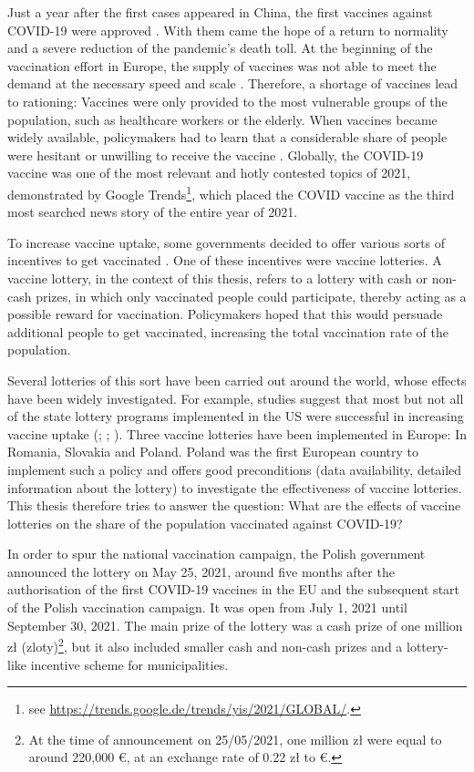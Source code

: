 \documentclass{scrbook}
\begin{document}
Just a year after the first cases appeared in China, the first vaccines
against COVID-19 were approved
\parencite{us_food_and_drug_administration_fda_2020}. With them came the
hope of a return to normality and a severe reduction of the pandemic's
death toll. At the beginning of the vaccination effort in Europe, the
supply of vaccines was not able to meet the demand at the necessary
speed and scale \parencite{bongardt_europes_2021}. Therefore, a shortage
of vaccines lead to rationing: Vaccines were only provided to the most
vulnerable groups of the population, such as healthcare workers or the
elderly. When vaccines became widely available, policymakers had to
learn that a considerable share of people were hesitant or unwilling to
receive the vaccine \parencite{steinert_covid-19_2022}. Globally, the
COVID-19 vaccine was one of the most relevant and hotly contested topics
of 2021, demonstrated by Google
Trends\footnote{see \url{https://trends.google.de/trends/yis/2021/GLOBAL/}.},
which placed the COVID vaccine as the third most searched news story of
the entire year of 2021.

To increase vaccine uptake, some governments decided to offer various
sorts of incentives to get vaccinated \parencite{wyllie_jewellery_2023}.
One of these incentives were vaccine lotteries. A vaccine lottery, in
the context of this thesis, refers to a lottery with cash or non-cash
prizes, in which only vaccinated people could participate, thereby
acting as a possible reward for vaccination. Policymakers hoped that
this would persuade additional people to get vaccinated, increasing the
total vaccination rate of the population.

Several lotteries of this sort have been carried out around the world,
whose effects have been widely investigated. For example, studies
suggest that most but not all of the state lottery programs implemented
in the US were successful in increasing vaccine uptake
(\cite{robertson_are_2021}; \cite{acharya_implementation_2021};
\cite{fuller_assessing_2022}). Three vaccine lotteries have been
implemented in Europe: In Romania, Slovakia and Poland. Poland was the
first European country to implement such a policy and offers good
preconditions (data availability, detailed information about the
lottery) to investigate the effectiveness of vaccine lotteries. This
thesis therefore tries to answer the question: What are the effects of
vaccine lotteries on the share of the population vaccinated against
COVID-19?

In order to spur the national vaccination campaign, the Polish
government announced the lottery
\parencite{service_of_the_republic_of_poland_national_2021} on May 25,
2021, around five months after the authorisation of the first COVID-19
vaccines in the EU and the subsequent start of the Polish vaccination
campaign. It was open from July 1, 2021 until September 30, 2021. The
main prize of the lottery was a cash prize of one million zł
(zloty)\footnote{At the time of announcement on 25/05/2021, one million zł were equal to around 220,000 €, at an exchange rate of 0.22 zł to €.},
but it also included smaller cash and non-cash prizes and a lottery-like
incentive scheme for municipalities.
\end{document}
